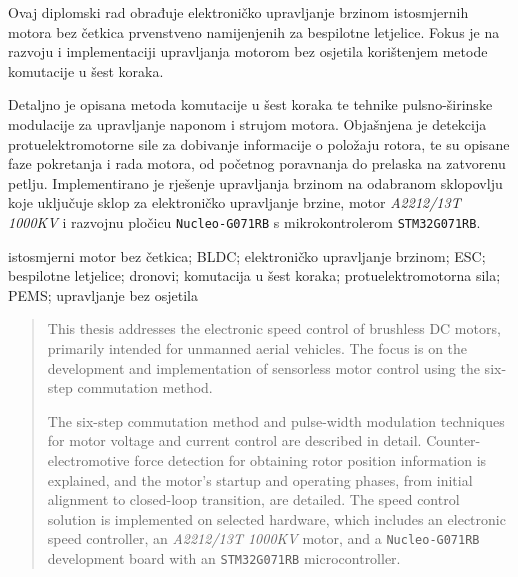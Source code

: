 \documentclass[diplomskirad]{fer}
\begin{document}

\begin{sazetak}

	Ovaj diplomski rad obrađuje elektroničko upravljanje brzinom istosmjernih
	motora bez četkica prvenstveno namijenjenih za bespilotne letjelice. Fokus je
	na razvoju i implementaciji upravljanja motorom bez osjetila korištenjem metode
	komutacije u šest koraka.

	Detaljno je opisana metoda komutacije u šest koraka te tehnike pulsno-širinske
	modulacije za upravljanje naponom i strujom motora. Objašnjena je detekcija
	protuelektromotorne sile za dobivanje informacije o položaju rotora, te su
	opisane faze pokretanja i rada motora, od početnog poravnanja do prelaska na
	zatvorenu petlju. Implementirano je rješenje upravljanja brzinom na odabranom
	sklopovlju koje uključuje sklop za elektroničko upravljanje brzine, motor
	\textit{A2212/13T 1000KV} i razvojnu pločicu \texttt{Nucleo-G071RB} s
	mikrokontrolerom \texttt{STM32G071RB}.
\end{sazetak}

\begin{kljucnerijeci}
	istosmjerni motor bez četkica; BLDC; elektroničko upravljanje brzinom; ESC; bespilotne letjelice; dronovi; komutacija u šest koraka; protuelektromotorna sila; PEMS; upravljanje bez osjetila
\end{kljucnerijeci}

\begin{abstract}

	This thesis addresses the electronic speed control of brushless DC motors,
	primarily intended for unmanned aerial vehicles. The focus is on the
	development and implementation of sensorless motor control using the six-step
	commutation method.

	The six-step commutation method and pulse-width modulation techniques for motor
	voltage and current control are described in detail. Counter-electromotive
	force detection for obtaining rotor position information is explained, and the
	motor's startup and operating phases, from initial alignment to closed-loop
	transition, are detailed. The speed control solution is implemented on selected
	hardware, which includes an electronic speed controller, an \textit{A2212/13T
		1000KV} motor, and a \texttt{Nucleo-G071RB} development board with an
	\texttt{STM32G071RB} microcontroller.
\end{abstract}
\end{document}
